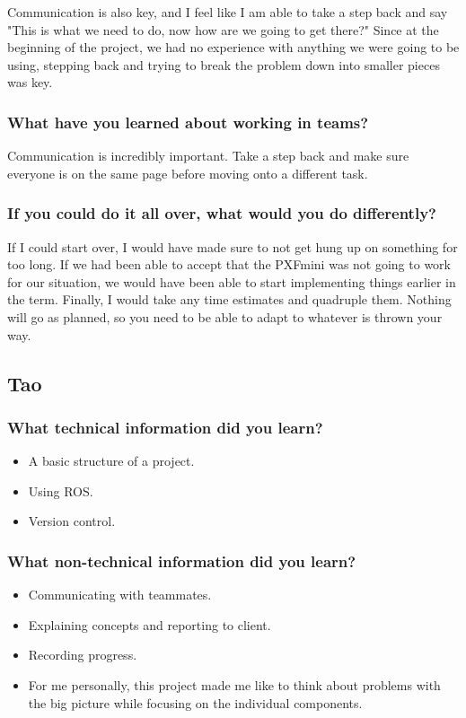 \documentclass[compsoc,draftclsnofoot,onecolumn,10pt]{IEEEtran}
\begin{document}
Communication is also key, and I feel like I am able to take a step back and say "This is what we need to do, now how are we going to get there?" Since at the beginning of the project, we had no experience with anything we were going to be using, stepping back and trying to break the problem down into smaller pieces was key. 

\subsubsection*{What have you learned about working in teams?}
Communication is incredibly important. Take a step back and make sure everyone is on the same page before moving onto a different task.

\subsubsection*{If you could do it all over, what would you do differently?}
If I could start over, I would have made sure to not get hung up on something for too long. If we had been able to accept that the PXFmini was not going to work for our situation, we would have been able to start implementing things earlier in the term. 
Finally, I would take any time estimates and quadruple them. Nothing will go as planned, so you need to be able to adapt to whatever is thrown your way.


\subsection{Tao}

\subsubsection*{What technical information did you learn?}
\begin{itemize}
    \item A basic structure of a project.
    \item Using ROS.
    \item Version control.
\end{itemize}

\subsubsection*{What non-technical information did you learn?}
\begin{itemize}
    \item Communicating with teammates.
    \item Explaining concepts and reporting to client.
    \item Recording progress.
    \item For me personally, this project made me like to think about
    problems with the big picture while focusing on the individual components.
\end{itemize}
\end{document}
